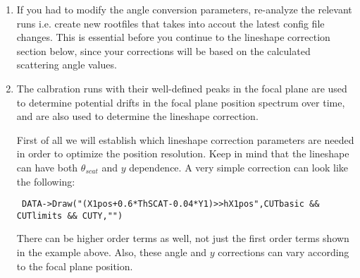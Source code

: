 \documentclass[11pt]{report}
\begin{document}
\begin{enumerate}
\begin{verbatim}
  for(int i=0;i<NThFPSCATSlope;i++)
  {
    if(i==0) result = result;
    if(i>0)  result += ThFP * ThFPSCATSlope[i] * pow(X1,i-1);
  }
  return result;
 \end{verbatim}
The focal-plane position-sensitive calibration of the 
horizontal scattering angle can be written in terms of 
the horizontal focal-plane angle as 
\begin{equation}
\theta_{scat}'=\theta_{fp}\sum_{i=0}^{2}a_{i}x_{fp}^{i} + \sum_{i=0}^{2}b_{i}x_{fp}^{i}  {\textrm   .}
\end{equation}
%
The important thing to check is whether the angle calibration parameters results
in a plot of thetaSCAT versus position that looks like a horizontal rectangle, with
the angle range approximately +-2 degrees.  The result in Fig.\ref{fig:thetascat-vs-X-run1104}
is already looking ok, but some improvements are still needed.


\begin{figure}[]
\centerline{\vspace{0cm}\hspace{0cm}
}
\centering
\caption{Plot of thetaSCAT {\it versus} the focal plane position spectrum for run 1104 of PR236.
Some modifications to the converson parameters are still required to ensure that the band of events
form a rectangle in the $\pm$2$^{circ}$ angle range.}
\label{fig:thetascat-vs-X-run1104}
\end{figure} 

\item 
If you had to modify the angle conversion parameters, re-analyze the relevant runs i.e. create new rootfiles that 
takes into accout the latest config file changes. This is essential before you continue to the lineshape correction
section below, since your corrections will be based on the calculated scattering angle values.

\item 
The calbration runs with their well-defined peaks in the focal plane are used to
determine potential drifts in the focal plane position spectrum over time, and are also
used to determine the lineshape correction.

First of all we will 
establish which lineshape correction parameters are needed in order to optimize the position resolution.
Keep in mind that the lineshape can have both $\theta_{scat}$ and $y$ dependence. 
A very simple correction can look like the following:
\begin{verbatim} DATA->Draw("(X1pos+0.6*ThSCAT-0.04*Y1)>>hX1pos",CUTbasic && CUTlimits && CUTY,"")  \end{verbatim}
There can be higher order terms as well, not just the first order terms shown in the example above.
Also, these angle and $y$ corrections can vary according to the focal plane position.


\end{enumerate}
\end{document}
